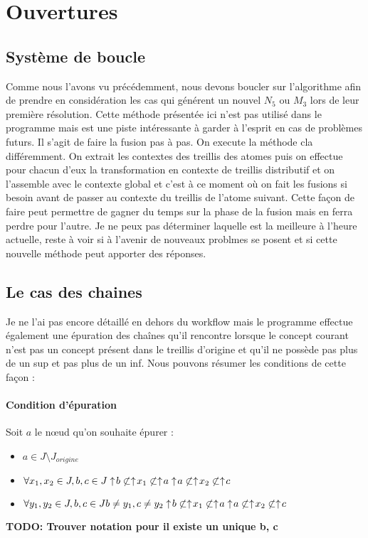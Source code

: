 \section{Ouvertures}

\subsection{Système de boucle}

Comme nous l'avons vu précédemment, nous devons boucler sur l'algorithme afin de prendre en considération les cas qui générent un nouvel $N_5$ ou $M_3$ lors de leur première résolution. Cette méthode présentée ici n'est pas utilisé dans le programme mais est une piste intéressante à garder à l'esprit en cas de problèmes futurs. Il s'agit de faire la fusion pas à pas. On execute la méthode cla différemment. On extrait les contextes des treillis des atomes puis on effectue pour chacun d'eux la transformation en contexte de treillis distributif et on l'assemble avec le contexte global et c'est à ce moment où on fait les fusions si besoin avant de passer au contexte du treillis de l'atome suivant. Cette façon de faire peut permettre de gagner du temps sur la phase de la fusion mais en ferra perdre pour l'autre. Je ne peux pas déterminer laquelle est la meilleure à l'heure actuelle, reste à voir si à l'avenir de nouveaux problmes se posent et si cette nouvelle méthode peut apporter des réponses.

\subsection{Le cas des chaines}

Je ne l'ai pas encore détaillé en dehors du workflow mais le programme effectue également une épuration des chaînes qu'il rencontre lorsque le concept courant n'est pas un concept présent dans le treillis d'origine et qu'il ne possède pas plus de un sup et pas plus de un inf. Nous pouvons résumer les conditions de cette façon :

\paragraph*{Condition d'épuration}
Soit $a$ le n\oe ud qu'on souhaite épurer :
\begin{itemize}
	\item $ a \in J \setminus J_{origine}$
	\item $\forall x_1, x_2 \in J, b, c \in J\\
		\uparrow \! b \not \subset \uparrow \! x_1 \not \subset \uparrow \! a\\
		\uparrow \! a \not \subset \uparrow \! x_2 \not \subset \uparrow \! c$
	\item $\forall y_1, y_2 \in J, b, c \in J\\
		b \neq y_1, c \neq y_2\\
		\uparrow \! b \not \subset \uparrow \! x_1 \not \subset \uparrow \! a\\
		\uparrow \! a \not \subset \uparrow \! x_2 \not \subset \uparrow \! c$
\end{itemize}
{\bf TODO: Trouver notation pour il existe un unique b, c}
\smallbreak

